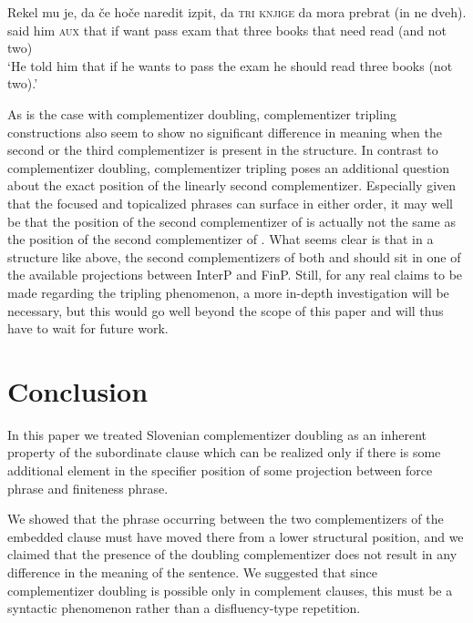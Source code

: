 \documentclass[output=paper,
]{langscibook}
\begin{document}
\begin{exe} 
\ex \label{ex:plesnicar:44}
\gll Rekel 	mu 	je, 	da 	če 	hoče 	naredit 	izpit, 	da 	\textsc{tri} \textsc{knjige} 	da 	mora 	prebrat 	(in ne dveh).\\
 said 	him	\textsc{aux} that if want pass exam that	three books that need	read (and not two)\\
\trans `He told him that if he wants to pass the exam he should read three books (not two).'
\end{exe}

\noindent As is the case with complementizer doubling, complementizer tripling constructions also seem to show no significant difference in meaning when the second or the third complementizer is present in the structure. In contrast to complementizer doubling, complementizer tripling poses an additional question about the exact position of the linearly second complementizer. Especially given that the focused and topicalized phrases can surface in either order, it may well be that the position of the second complementizer of  is actually not the same as the position of the second complementizer of . What seems clear is that in a structure like  above, the second complementizers of both  and  should sit in one of the available projections between InterP and FinP. Still, for any real claims to be made regarding the tripling phenomenon, a more in-depth investigation will be necessary, but this would go well beyond the scope of this paper and will thus have to wait for future work.

\section{Conclusion}

In this paper we treated Slovenian complementizer doubling as an inherent property of the subordinate clause which can be realized only if there is some additional element in the specifier position of some projection between force phrase and finiteness phrase. 

We showed that the phrase occurring between the two complementizers of the embedded clause must have moved there from a lower structural position, and we claimed that the presence of the doubling complementizer does not result in any difference in the meaning of the sentence. We suggested that since complementizer doubling is possible only in complement clauses, this must be a syntactic phenomenon rather than a disfluency-type repetition.
\end{document}
